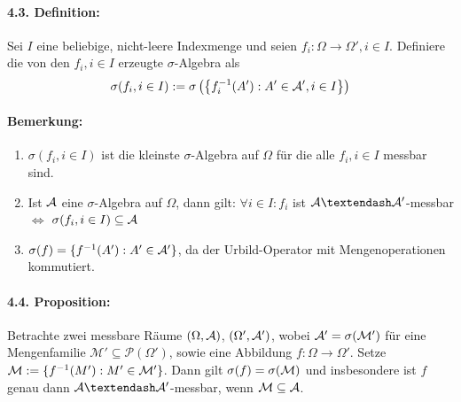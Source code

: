 \paragraph{4.3. Definition:}Sei $I$ eine beliebige, nicht-leere Indexmenge und seien $f_i:\Omega\to\Omega',i\in I$. Definiere die von den $f_i,i\in I$ erzeugte $\sigma$-Algebra als
$$\sigma(f_i,i\in I):=\sigma\left(\left\{f_i^{-1}(A'):A'\in\mathcal{A}',i\in I\right\}\right)$$
 
 \paragraph{Bemerkung:}
 \begin{enumerate}[label=(\roman*)]
     \item $\sigma(f_i,i\in I)$ ist die kleinste $\sigma$-Algebra auf $\Omega$ f\"ur die alle $f_i,i\in I$ messbar sind.
     \item Ist $\mathcal{A}$ eine $\sigma$-Algebra auf $\Omega$, dann gilt: $\forall i\in I:f_i$ ist $\A\textendash\A'$-messbar $\iff$ $\sigma(f_i,i\in I)\subseteq\mathcal{A}$
     \item $\sigma(f)=\{f^{-1}(A'):A'\in\mathcal{A}'\}$, da der Urbild-Operator mit Mengenoperationen kommutiert. 
 \end{enumerate}
 
 \paragraph{4.4. Proposition:}Betrachte zwei messbare R\"aume $(\Omega,\mathcal{A})$, $(\Omega',\mathcal{A}')$, wobei $\mathcal{A}'=\sigma(\mathcal{M'})$ f\"ur eine Mengenfamilie $\mathcal{M'}\subseteq\mathcal{P}(\Omega')$, sowie eine Abbildung $f:\Omega\to\Omega'$. Setze $\mathcal{M}:=\{f^{-1}(M'):M'\in\mathcal{M}'\}$. Dann gilt $\sigma(f)=\sigma(\mathcal{M})$ und insbesondere ist $f$ genau dann $\A\textendash\A'$-messbar, wenn $\mathcal{M}\subseteq\mathcal{A}$.
 
